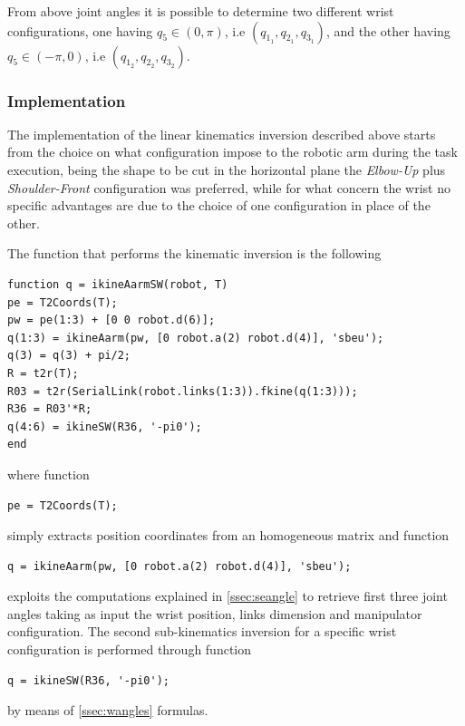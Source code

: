 From above joint angles it is possible to determine two different wrist configurations, one having $q_5 \in \left(0, \pi\right)$, i.e $(q_{1_1},q_{2_1},q_{3_1}) $, and the other having  $q_5 \in \left(-\pi, 0\right)$, i.e $(q_{1_2},q_{2_2},q_{3_2})$.

\subsubsection{Implementation}

The implementation of the linear kinematics inversion described above starts from the choice on what configuration impose to the robotic arm during the task execution, being the shape to be cut in the horizontal plane the \textit{Elbow-Up} plus \textit{Shoulder-Front} configuration was preferred, while for what concern the wrist no specific advantages are due to the choice of one configuration in place of the other.

The function that performs the kinematic inversion is the following
\begin{lstlisting}
function q = ikineAarmSW(robot, T)
pe = T2Coords(T);
pw = pe(1:3) + [0 0 robot.d(6)];
q(1:3) = ikineAarm(pw, [0 robot.a(2) robot.d(4)], 'sbeu');
q(3) = q(3) + pi/2;
R = t2r(T);
R03 = t2r(SerialLink(robot.links(1:3)).fkine(q(1:3)));
R36 = R03'*R;
q(4:6) = ikineSW(R36, '-pi0');
end
\end{lstlisting}
where function
\begin{lstlisting}
pe = T2Coords(T);
\end{lstlisting}
simply extracts position coordinates from an homogeneous matrix and function  
\begin{lstlisting}
q = ikineAarm(pw, [0 robot.a(2) robot.d(4)], 'sbeu');
\end{lstlisting}
exploits the computations explained in \ref{ssec:seangle} to retrieve first three joint angles taking as input the wrist position, links dimension and manipulator configuration. The second sub-kinematics inversion for a specific wrist configuration is performed through function
\begin{lstlisting}
q = ikineSW(R36, '-pi0');
\end{lstlisting}
by means of \ref{ssec:wangles} formulas.
\newpage
